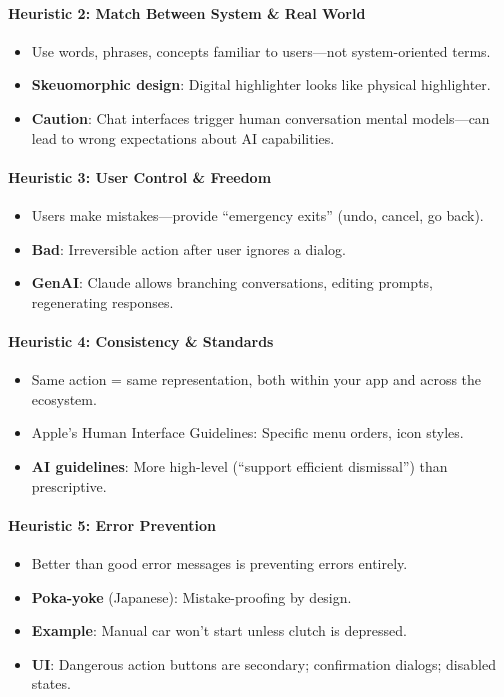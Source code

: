 \paragraph*{Heuristic 2: Match Between System \& Real World}
\begin{itemize}
  \item Use words, phrases, concepts familiar to users---not system-oriented terms.
  \item \textbf{Skeuomorphic design}: Digital highlighter looks like physical highlighter.
  \item \textbf{Caution}: Chat interfaces trigger human conversation mental models---can lead to wrong expectations about AI capabilities.
\end{itemize}

\paragraph*{Heuristic 3: User Control \& Freedom}
\begin{itemize}
  \item Users make mistakes---provide ``emergency exits'' (undo, cancel, go back).
  \item \textbf{Bad}: Irreversible action after user ignores a dialog.
  \item \textbf{GenAI}: Claude allows branching conversations, editing prompts, regenerating responses.
\end{itemize}

\paragraph*{Heuristic 4: Consistency \& Standards}
\begin{itemize}
  \item Same action = same representation, both within your app and across the ecosystem.
  \item Apple's Human Interface Guidelines: Specific menu orders, icon styles.
  \item \textbf{AI guidelines}: More high-level (``support efficient dismissal'') than prescriptive.
\end{itemize}

\paragraph*{Heuristic 5: Error Prevention}
\begin{itemize}
  \item Better than good error messages is preventing errors entirely.
  \item \textbf{Poka-yoke} (Japanese): Mistake-proofing by design.
  \item \textbf{Example}: Manual car won't start unless clutch is depressed.
  \item \textbf{UI}: Dangerous action buttons are secondary; confirmation dialogs; disabled states.
\end{itemize}

